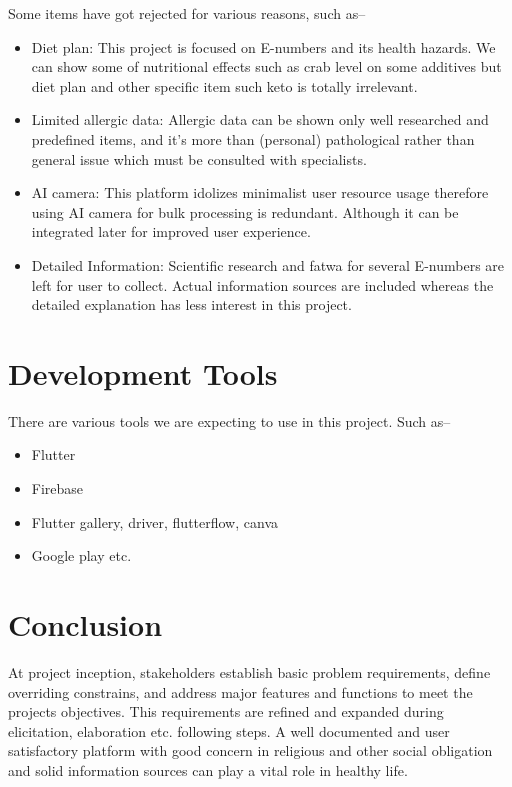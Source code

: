 \documentclass[a4paper,12pt]{report}
\begin{document}
Some items have got rejected for various reasons, such as--
\begin{itemize}
	\item Diet plan: This project is focused on E-numbers and its health hazards. We can show some of nutritional effects such as crab level on some additives but diet plan and other specific item such keto is totally irrelevant.
	\item Limited allergic data: Allergic data can be shown only well researched and predefined items, and it's more than (personal) pathological rather than general issue which must be consulted with specialists.
	\item AI camera: This platform idolizes minimalist user resource usage therefore using AI camera for bulk processing is redundant. Although it can be integrated later for improved user experience.
	\item Detailed Information: Scientific research and fatwa for several E-numbers are left for user to collect. Actual information sources are included whereas the detailed explanation has less interest in this project.
\end{itemize}

\section*{Development Tools}
There are various tools we are expecting to use in this project. Such as--
\begin{itemize}
	\item Flutter
	\item Firebase
	\item Flutter gallery, driver, flutterflow, canva
	\item Google play etc.
\end{itemize}
\section*{Conclusion}
At project inception, stakeholders establish basic problem requirements, define overriding constrains, and address major features and functions to meet the projects objectives. This requirements are refined and expanded during elicitation, elaboration etc. following steps.
A well documented and user satisfactory platform with good concern in religious and other social obligation and solid information sources can play a vital role in healthy life.



\renewcommand{\bibname}{\Large Reference}


\end{document}
